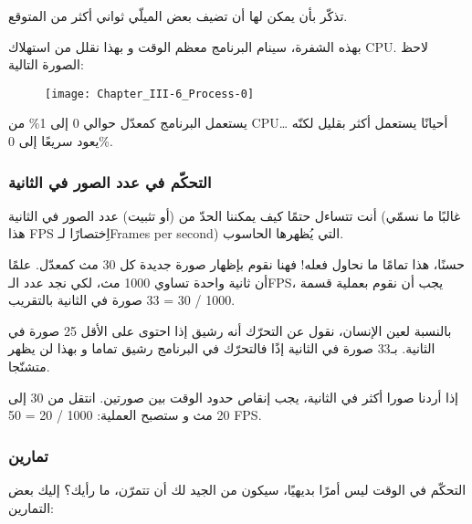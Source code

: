 \begin{information}
تذكّر بأن
يمكن لها أن تضيف بعض الميلّي ثواني أكثر من المتوقع.
\end{information}

بهذه الشفرة، سينام البرنامج معظم الوقت و بهذا نقلل من استهلاك
\textenglish{CPU}.
لاحظ الصورة التالية:

\begin{figure}[H]
	\centering
	\texttt{[image: Chapter\_III-6\_Process-0]}
\end{figure}

يستعمل البرنامج كمعدّل حوالي 0 إلى 1\% من 
\textenglish{CPU}\dots
أحيانًا يستعمل أكثر بقليل لكنّه يعود سريعًا إلى 0\%.

\subsubsection{التحكّم في عدد الصور في الثانية}

أنت تتساءل حتمًا كيف يمكننا الحدّ من (أو تثبيت) عدد الصور في الثانية (غالبًا ما نسمّي هذا
\textenglish{FPS}
اِختصارًا لـ\textenglish{Frames per second})
التي يُظهرها الحاسوب.

حسنًا، هذا تمامًا ما نحاول فعله! فهنا نقوم بإظهار صورة جديدة كل 30 مث كمعدّل. علمًا أن ثانية واحدة تساوي 1000 مث، لكي نجد عدد الـ\textenglish{FPS}،
يجب أن نقوم بعملية قسمة
1000 / 30 = 33
 صورة في الثانية بالتقريب.
 
بالنسبة لعين الإنسان، نقول عن التحرّك أنه رشيق إذا احتوى على الأقل 25 صورة في الثانية. بـ33 صورة في الثانية إذًا فالتحرّك في البرنامج رشيق تماما و بهذا لن يظهر متشنّجا. 

إذا أردنا صورا أكثر في الثانية، يجب إنقاص حدود الوقت بين صورتين. انتقل من 30 إلى 20 مث و ستصبح العملية:
1000 / 20 = 50 \textenglish{FPS}.

\subsubsection{تمارين}
التحكّم في الوقت ليس أمرًا بديهيًا، سيكون من الجيد لك أن تتمرّن، ما رأيك؟ إليك بعض التمارين:

